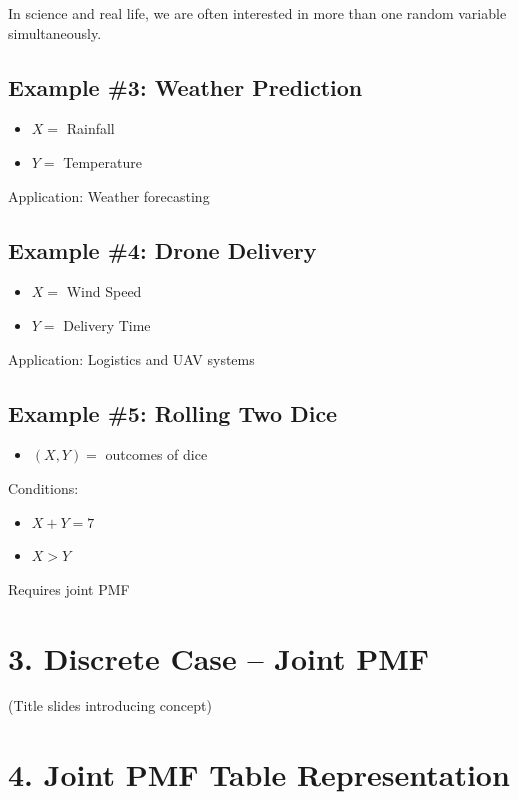 \documentclass[12pt]{article}
\begin{document}
In science and real life, we are often interested in more than one random variable simultaneously.

\subsection*{Example \#3: Weather Prediction}

\begin{itemize}
    \item $X =$ Rainfall
    \item $Y =$ Temperature
\end{itemize}

Application: Weather forecasting

\subsection*{Example \#4: Drone Delivery}

\begin{itemize}
    \item $X =$ Wind Speed
    \item $Y =$ Delivery Time
\end{itemize}

Application: Logistics and UAV systems

\subsection*{Example \#5: Rolling Two Dice}

\begin{itemize}
    \item $(X, Y) =$ outcomes of dice
\end{itemize}

Conditions:
\begin{itemize}
    \item $X + Y = 7$
    \item $X > Y$
\end{itemize}

Requires joint PMF

\section*{3. Discrete Case -- Joint PMF}

(Title slides introducing concept)

\section*{4. Joint PMF Table Representation}
\end{document}
